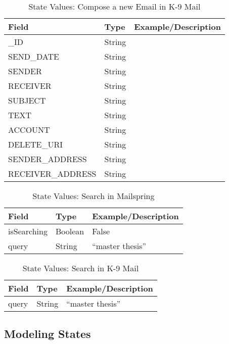 \FloatBarrier \begin{table}[H]
\centering
\begin{tabular}{lll}
Field     & Type      & Example/Description \\
\hline
\_ID            & String &  \\
SEND\_DATE      & String     &                     \\
SENDER         &  String    &                     \\
RECEIVER         &  String    &                     \\
SUBJECT        &  String    &                     \\
TEXT        &  String    &                     \\
ACCOUNT        &   String   &                     \\
DELETE\_URI     &  String    &                     \\
SENDER\_ADDRESS &   String   &                    \\
RECEIVER\_ADDRESS &   String   &                    
\end{tabular}
\caption{State Values: Compose a new Email in K-9 Mail}
\label{tab:compose_new_email_k9}
\centering
\end{table} \FloatBarrier



\FloatBarrier \begin{table}[H]
\centering
\begin{tabular}{lll}
Field       & Type    & Example/Description \\
\hline
isSearching & Boolean & False               \\
query       & String  & “master   thesis”  
\end{tabular}
\caption{State Values: Search in Mailspring}
\label{tab:search_mailspring}
\end{table} \FloatBarrier



\FloatBarrier \begin{table}[H]
\centering
\begin{tabular}{lll}
Field & Type   & Example/Description \\
\hline
query & String & “master thesis”    
\end{tabular}
\caption{State Values: Search in K-9 Mail}
\label{tab:search_k9}
\end{table} \FloatBarrier


\subsection{Modeling States}
